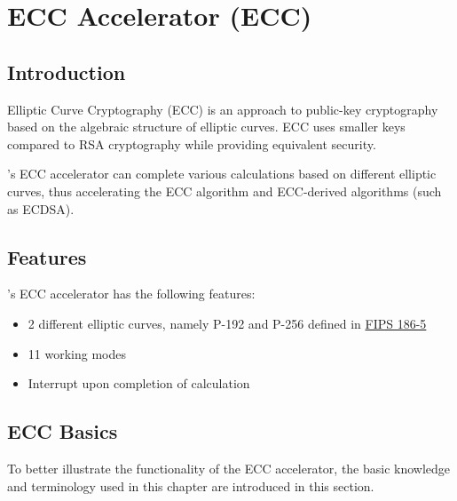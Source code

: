 \documentclass[main\_\_EN.tex]{subfiles}
\begin{document}

\ifglobal
\else
    {\let\clearpage\relax \listoftodos}
    {\let\clearpage\relax \listofdonetodos}
    \tableofcontents
\fi



\hypertarget{ecc}{}
\chapter{ECC Accelerator (ECC)}
\label{mod:ecc}



\section{Introduction}

Elliptic Curve Cryptography (ECC) is an approach to public-key cryptography based on the algebraic structure of elliptic curves. ECC uses smaller keys compared to RSA cryptography while providing equivalent security.

\chipname{}'s ECC accelerator can complete various calculations based on different elliptic curves, thus accelerating the ECC algorithm and ECC-derived algorithms (such as ECDSA).

\section{Features}
\chipname{}'s ECC accelerator has the following features:
\begin{itemize}
    \item 2 different elliptic curves, namely P-192 and P-256 defined in \href{https://nvlpubs.nist.gov/nistpubs/FIPS/NIST.FIPS.186-5.pdf}{FIPS 186-5}
    \item 11 working modes
    \item Interrupt upon completion of calculation
\end{itemize}

\section{ECC Basics}
To better illustrate the functionality of the ECC accelerator, the basic knowledge and terminology used in this chapter are introduced in this section.
\end{document}
